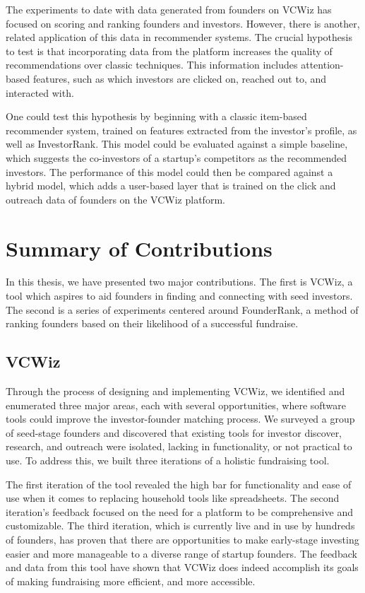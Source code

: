 The experiments to date with data generated from founders on VCWiz has focused on scoring and ranking founders and investors. However, there is another, related application of this data in recommender systems. The crucial hypothesis to test is that incorporating data from the platform increases the quality of recommendations over classic techniques. This information includes attention-based features, such as which investors are clicked on, reached out to, and interacted with.

One could test this hypothesis by beginning with a classic item-based recommender system, trained on features extracted from the investor's profile, as well as InvestorRank. This model could be evaluated against a simple baseline, which suggests the co-investors of a startup's competitors as the recommended investors. The performance of this model could then be compared against a hybrid model, which adds a user-based layer that is trained on the click and outreach data of founders on the VCWiz platform.

\section{Summary of Contributions}

In this thesis, we have presented two major contributions. The first is VCWiz, a tool which aspires to aid founders in finding and connecting with seed investors. The second is a series of experiments centered around FounderRank, a method of ranking founders based on their likelihood of a successful fundraise.

\subsection{VCWiz}

Through the process of designing and implementing VCWiz, we identified and enumerated three major areas, each with several opportunities, where software tools could improve the investor-founder matching process. We surveyed a group of seed-stage founders and discovered that existing tools for investor discover, research, and outreach were isolated, lacking in functionality, or not practical to use. To address this, we built three iterations of a holistic fundraising tool.

The first iteration of the tool revealed the high bar for functionality and ease of use when it comes to replacing household tools like spreadsheets. The second iteration's feedback focused on the need for a platform to be comprehensive and customizable. The third iteration, which is currently live and in use by hundreds of founders, has proven that there are opportunities to make early-stage investing easier and more manageable to a diverse range of startup founders. The feedback and data from this tool have shown that VCWiz does indeed accomplish its goals of making fundraising more efficient, and more accessible.


